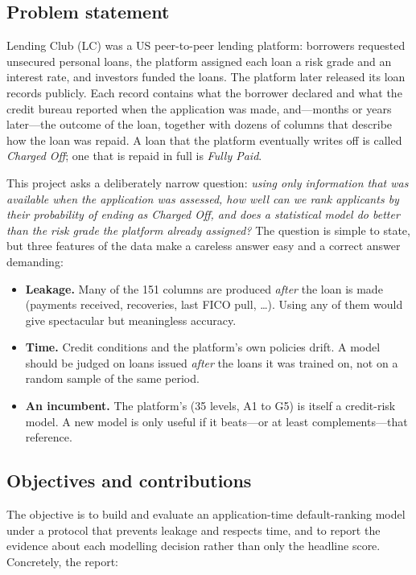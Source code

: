 \subsection*{Problem statement}

Lending Club (LC) was a US peer-to-peer lending platform: borrowers requested unsecured personal loans, the platform assigned each loan a risk grade and an interest rate, and investors funded the loans. The platform later released its loan records publicly. Each record contains what the borrower declared and what the credit bureau reported when the application was made, and---months or years later---the outcome of the loan, together with dozens of columns that describe how the loan was repaid. A loan that the platform eventually writes off is called \emph{Charged Off}; one that is repaid in full is \emph{Fully Paid}.

This project asks a deliberately narrow question: \emph{using only information that was available when the application was assessed, how well can we rank applicants by their probability of ending as Charged Off, and does a statistical model do better than the risk grade the platform already assigned?} The question is simple to state, but three features of the data make a careless answer easy and a correct answer demanding:

\begin{itemize}
    \item \textbf{Leakage.} Many of the 151 columns are produced \emph{after} the loan is made (payments received, recoveries, last FICO pull, \dots). Using any of them would give spectacular but meaningless accuracy.
    \item \textbf{Time.} Credit conditions and the platform's own policies drift. A model should be judged on loans issued \emph{after} the loans it was trained on, not on a random sample of the same period.
    \item \textbf{An incumbent.} The platform's  (35 levels, A1 to G5) is itself a credit-risk model. A new model is only useful if it beats---or at least complements---that reference.
\end{itemize}

\subsection*{Objectives and contributions}

The objective is to build and evaluate an application-time default-ranking model under a protocol that prevents leakage and respects time, and to report the evidence about each modelling decision rather than only the headline score. Concretely, the report:

